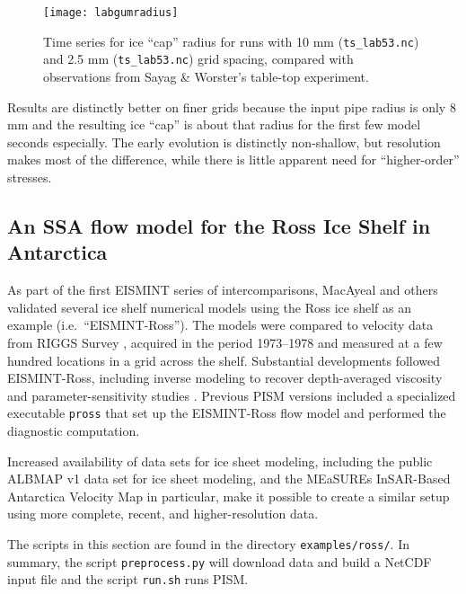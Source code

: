 \begin{figure}[ht]
\centering
\texttt{[image: labgumradius]}
\caption{Time series for ice ``cap'' radius for runs with 10 mm (\texttt{ts_lab53.nc}) and 2.5 mm (\texttt{ts_lab53.nc}) grid spacing, compared with observations from Sayag \& Worster's \cite{SayagWorster2013} table-top experiment.}
\label{fig:labgumresult}
\end{figure}

Results are distinctly better on finer grids because the input pipe radius is only 8 mm and the resulting ice ``cap'' is about that radius for the first few model seconds especially.  The early evolution is distinctly non-shallow, but resolution makes most of the difference, while there is little apparent need for ``higher-order'' stresses.


\subsection{An SSA flow model for the Ross Ice Shelf in Antarctica}\label{sec:ross}   

As part of the first EISMINT series of intercomparisons, MacAyeal and others \cite{MacAyealetal} validated several ice shelf numerical models using the Ross ice shelf as an example (i.e.~``EISMINT-Ross'').  The models were compared to velocity data from RIGGS Survey \cite{RIGGS2,RIGGS1}, acquired in the period 1973--1978 and measured at a few hundred locations in a grid across the shelf.  Substantial developments followed EISMINT-Ross, including inverse modeling to recover depth-averaged viscosity \cite{RommelaereMacAyeal} and parameter-sensitivity studies \cite{HumbertGreveHutter}.  Previous PISM versions included a specialized executable \texttt{pross} that set up the EISMINT-Ross flow model and performed the diagnostic computation.

Increased availability of data sets for ice sheet modeling, including the public ALBMAP v1 \cite{LeBrocqetal2010} data set for ice sheet modeling, and the MEaSUREs InSAR-Based Antarctica Velocity Map \cite{Rignotetal2011} in particular, make it possible to create a similar setup using more complete, recent, and higher-resolution data.

The scripts in this section are found in the directory \texttt{examples/ross/}.  In summary, the script \texttt{preprocess.py} will download data and build a NetCDF input file and the script \texttt{run.sh} runs PISM.


